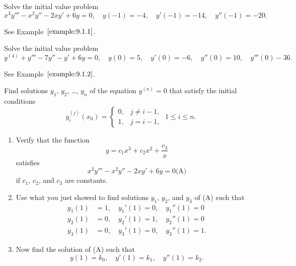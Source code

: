 \documentclass{ximera}
\begin{document}
\begin{problem}\label{exer:9.1.2}
Solve the initial value problem
$$
x^3y'''-x^2 y''-2xy'+6y=0,
\quad   y(-1)=-4, \quad   y'(-1)=-14,\quad   y''(-1)=-20.
$$

\begin{hint}
See Example~$\ref{example:9.1.1}$.
\end{hint}
\end{problem}


\begin{problem}\label{exer:9.1.3}
Solve the initial value problem
$$
y^{(4)}+y'''-7y''-y'+6y=0,
\quad   y(0)=5,\quad   y'(0)=-6,\quad   y''(0)=10,\quad   y'''(0)-36.
$$

\begin{hint}
See Example~$\ref{example:9.1.2}$.
\end{hint}
\end{problem}

\begin{problem}\label{exer:9.1.4}
Find solutions $y_1$, $y_2$, \dots, $y_n$ of the equation $y^{(n)}=0$
that satisfy the initial conditions
$$
y_i^{(j)}(x_0)=\left\{\begin{array}{cl}
0,&j\ne i-1,\\ 
1,&j=i-1,\end{array}\right.\; 1\le i\le n.
$$
\end{problem}

\begin{problem}\label{exer:9.1.5}
\begin{enumerate}
\item %
Verify that the function
$$
y=c_1x^3+c_2x^2+\frac{c_3}{x}
$$
satisfies
$$
x^3 y'''-x^2y''-2xy'+6y=0
\text{(A)}
$$
if $c_1$, $c_2$, and $c_3$ are constants.

\item %
Use what you just showed to find solutions $y_1$, $y_2$, and $y_3$ of
(A) such that
$$
\begin{array}{rl}
y_1(1)&=1,\quad y_1'(1)=0,\quad  y_1''(1)=0  \\ 
y_2(1)&=0,\quad  y_2'(1)=1,\quad  y_2''(1)=0  \\ 
y_3(1)&=0,\quad  y_3'(1)=0,\quad  y_3''(1)=1.
\end{array}
$$


\item %
Now find the solution of (A) such that
$$
y(1)=k_0,\quad y'(1)=k_1,\quad   y''(1)=k_2.
$$
\end{enumerate}
\end{problem}
\end{document}
